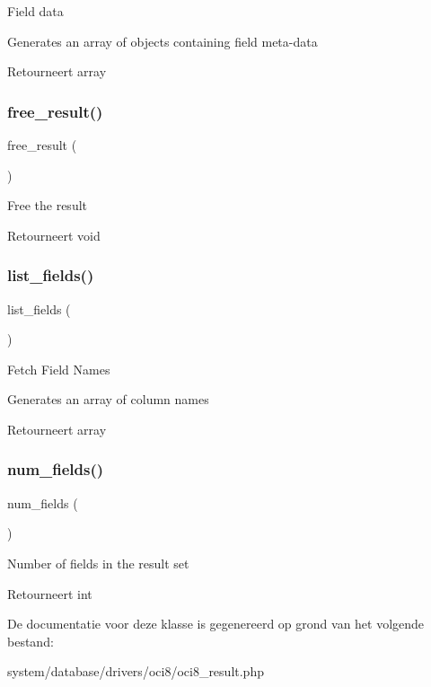 Field data

Generates an array of objects containing field meta-\/data

\begin{DoxyReturn}{Retourneert}
array 
\end{DoxyReturn}
\mbox{\label{class_c_i___d_b__oci8__result_aad2d98d6beb3d6095405356c6107b473}} 
\subsubsection{\texorpdfstring{free\_result()}{free\_result()}}
{\footnotesize\ttfamily free\+\_\+result (\begin{DoxyParamCaption}{ }\end{DoxyParamCaption})}

Free the result

\begin{DoxyReturn}{Retourneert}
void 
\end{DoxyReturn}
\mbox{\label{class_c_i___d_b__oci8__result_a50b54eb4ea7cfd039740f532988ea776}} 
\subsubsection{\texorpdfstring{list\_fields()}{list\_fields()}}
{\footnotesize\ttfamily list\+\_\+fields (\begin{DoxyParamCaption}{ }\end{DoxyParamCaption})}

Fetch Field Names

Generates an array of column names

\begin{DoxyReturn}{Retourneert}
array 
\end{DoxyReturn}
\mbox{\label{class_c_i___d_b__oci8__result_af831bf363e4d7d661a717a4932af449d}} 
\subsubsection{\texorpdfstring{num\_fields()}{num\_fields()}}
{\footnotesize\ttfamily num\+\_\+fields (\begin{DoxyParamCaption}{ }\end{DoxyParamCaption})}

Number of fields in the result set

\begin{DoxyReturn}{Retourneert}
int 
\end{DoxyReturn}


De documentatie voor deze klasse is gegenereerd op grond van het volgende bestand\+:\begin{DoxyCompactItemize}
\item 
system/database/drivers/oci8/oci8\+\_\+result.\+php\end{DoxyCompactItemize}
